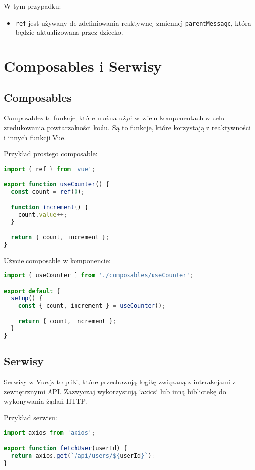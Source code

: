 \documentclass[a4paper,12pt]{article}
\begin{document}
W tym przypadku:
\begin{itemize}
  \item \texttt{ref} jest używany do zdefiniowania reaktywnej zmiennej \texttt{parentMessage}, która będzie aktualizowana przez dziecko.
\end{itemize}


\section{Composables i Serwisy}

\subsection{Composables}
Composables to funkcje, które można użyć w wielu komponentach w celu zredukowania powtarzalności kodu. Są to funkcje, które korzystają z reaktywności i innych funkcji Vue.

Przykład prostego composable:

\begin{lstlisting}[language=JavaScript]
import { ref } from 'vue';

export function useCounter() {
  const count = ref(0);

  function increment() {
    count.value++;
  }

  return { count, increment };
}
\end{lstlisting}

Użycie composable w komponencie:

\begin{lstlisting}[language=JavaScript]
import { useCounter } from './composables/useCounter';

export default {
  setup() {
    const { count, increment } = useCounter();

    return { count, increment };
  }
}
\end{lstlisting}

\subsection{Serwisy}
Serwisy w Vue.js to pliki, które przechowują logikę związaną z interakcjami z zewnętrznymi API. Zazwyczaj wykorzystują `axios` lub inną bibliotekę do wykonywania żądań HTTP.

Przykład serwisu:

\begin{lstlisting}[language=JavaScript]
import axios from 'axios';

export function fetchUser(userId) {
  return axios.get(`/api/users/${userId}`);
}
\end{lstlisting}
\end{document}
